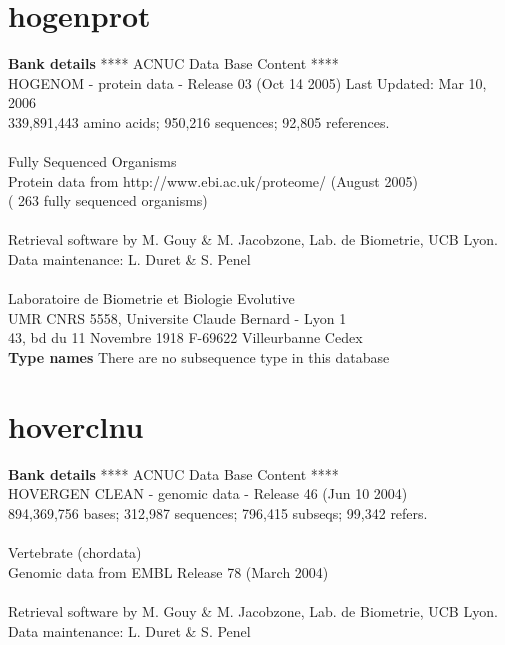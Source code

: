 \documentclass{article}
\begin{document}
\begin{Schunk}
\section{ hogenprot }
\textbf{Bank details}
               ****     ACNUC Data Base Content      ****                      \\
  HOGENOM - protein data - Release 03 (Oct 14 2005) Last Updated: Mar 10, 2006\\
          339,891,443 amino acids; 950,216 sequences; 92,805 references.\\
                                                                               \\
                        Fully Sequenced Organisms\\
   Protein data from http://www.ebi.ac.uk/proteome/ (August 2005)\\
	            ( 263 fully sequenced organisms)\\
\\
Retrieval software by M. Gouy \& M. Jacobzone, Lab. de Biometrie, UCB Lyon.\\
Data maintenance: L. Duret \& S. Penel\\
\\
Laboratoire de Biometrie et Biologie Evolutive\\
UMR CNRS 5558, Universite Claude Bernard - Lyon 1 \\
43, bd du 11 Novembre 1918 F-69622 Villeurbanne Cedex\\


\textbf{Type names}
There are no subsequence type in this database
\section{ hoverclnu }
\textbf{Bank details}
               ****     ACNUC Data Base Content      ****                      \\
         HOVERGEN CLEAN - genomic data - Release 46 (Jun 10 2004)\\
894,369,756 bases; 312,987 sequences; 796,415 subseqs; 99,342 refers.\\
                                                                               \\
                       Vertebrate (chordata)\\
             Genomic data from EMBL Release 78  (March 2004)\\
\\
Retrieval software by M. Gouy \& M. Jacobzone, Lab. de Biometrie, UCB Lyon.\\
Data maintenance: L. Duret \& S. Penel\\



\end{Schunk}
\end{document}
